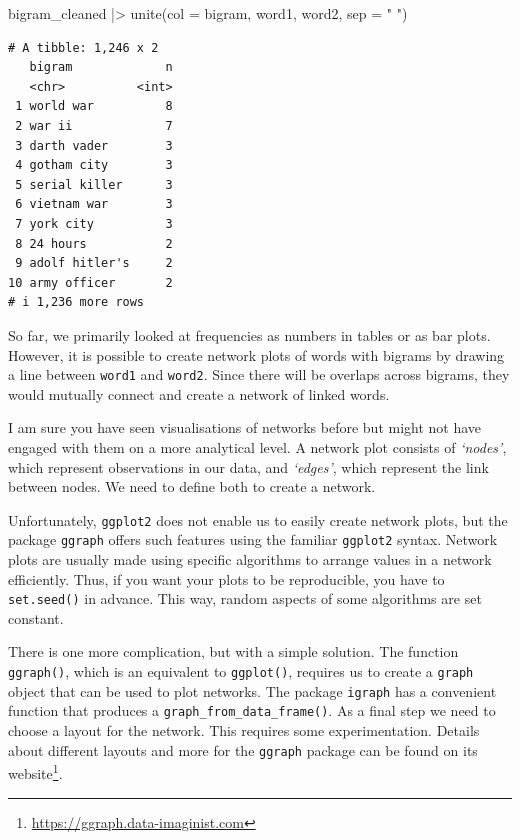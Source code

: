 \documentclass[
  letterpaper,
]{krantz}
\makeatletter
\newenvironment{Shaded}{\begin{snugshade}}{\end{snugshade}}
\newcommand{\AttributeTok}[1]{\textcolor[rgb]{0.40,0.45,0.13}{#1}}
\newcommand{\FunctionTok}[1]{\textcolor[rgb]{0.28,0.35,0.67}{#1}}
\newcommand{\NormalTok}[1]{\textcolor[rgb]{0.00,0.23,0.31}{#1}}
\newcommand{\SpecialCharTok}[1]{\textcolor[rgb]{0.37,0.37,0.37}{#1}}
\newcommand{\StringTok}[1]{\textcolor[rgb]{0.13,0.47,0.30}{#1}}
\renewcommand{\href}[2]{#2\footnote{\url{#1}}}
\newenvironment{kframe}{%
\medskip{}
\setlength{\fboxsep}{.8em}
 \def\at@end@of@kframe{}%
 \ifinner\ifhmode%
  \def\at@end@of@kframe{\end{minipage}}%
  \begin{minipage}{\columnwidth}%
 \fi\fi%
 \def\FrameCommand##1{\hskip\@totalleftmargin \hskip-\fboxsep
 \colorbox{shadecolor}{##1}\hskip-\fboxsep
     \hskip-\linewidth \hskip-\@totalleftmargin \hskip\columnwidth}%
 \MakeFramed {\advance\hsize-\width
   \@totalleftmargin\z@ \linewidth\hsize
   \@setminipage}}%
 {\par\unskip\endMakeFramed%
 \at@end@of@kframe}
\renewenvironment{Shaded}{\begin{kframe}}{\end{kframe}}
\makeatother
\begin{document}
\begin{Shaded}
\begin{Highlighting}[]
\NormalTok{bigram\_cleaned }\SpecialCharTok{|\textgreater{}}
  \FunctionTok{unite}\NormalTok{(}\AttributeTok{col =}\NormalTok{ bigram,}
\NormalTok{        word1, word2,}
        \AttributeTok{sep =} \StringTok{" "}\NormalTok{)}
\end{Highlighting}
\end{Shaded}

\begin{verbatim}
# A tibble: 1,246 x 2
   bigram             n
   <chr>          <int>
 1 world war          8
 2 war ii             7
 3 darth vader        3
 4 gotham city        3
 5 serial killer      3
 6 vietnam war        3
 7 york city          3
 8 24 hours           2
 9 adolf hitler's     2
10 army officer       2
# i 1,236 more rows
\end{verbatim}

So far, we primarily looked at frequencies as numbers in tables or as
bar plots. However, it is possible to create network plots of words with
bigrams by drawing a line between \texttt{word1} and \texttt{word2}.
Since there will be overlaps across bigrams, they would mutually connect
and create a network of linked words.

I am sure you have seen visualisations of networks before but might not
have engaged with them on a more analytical level. A network plot
consists of \emph{`nodes'}, which represent observations in our data,
and \emph{`edges'}, which represent the link between nodes. We need to
define both to create a network.

Unfortunately, \texttt{ggplot2} does not enable us to easily create
network plots, but the package \texttt{ggraph} offers such features
using the familiar \texttt{ggplot2} syntax. Network plots are usually
made using specific algorithms to arrange values in a network
efficiently. Thus, if you want your plots to be reproducible, you have
to \texttt{set.seed()} in advance. This way, random aspects of some
algorithms are set constant.

There is one more complication, but with a simple solution. The function
\texttt{ggraph()}, which is an equivalent to \texttt{ggplot()}, requires
us to create a \texttt{graph} object that can be used to plot networks.
The package \texttt{igraph} has a convenient function that produces a
\texttt{graph\_from\_data\_frame()}. As a final step we need to choose a
layout for the network. This requires some experimentation. Details
about different layouts and more for the \texttt{ggraph} package can be
found on its \href{https://ggraph.data-imaginist.com}{website}.
\end{document}
